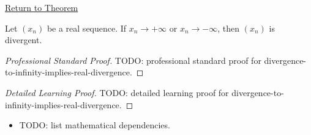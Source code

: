 \newpage
{}
\label{prf:divergence-to-infinity-implies-real-divergence}

\begin{remark*}[Return]
\hyperref[thm:divergence-to-infinity-implies-real-divergence]{Return to Theorem}
\end{remark*}

\begin{theorem*}
Let $(x_n)$ be a real sequence. If $x_n\to+\infty$ or $x_n\to-\infty$,
then $(x_n)$ is divergent.

\smallskip
\noindent
\end{theorem*}

\begin{proof}[Professional Standard Proof]
\LRAProofBodyStart
TODO: professional standard proof for divergence-to-infinity-implies-real-divergence.
\end{proof}

\begin{proof}[Detailed Learning Proof]
\LRAProofBodyStart
TODO: detailed learning proof for divergence-to-infinity-implies-real-divergence.
\end{proof}

\begin{remark*}
\end{remark*}

\begin{dependencies}
\begin{itemize}
  \item TODO: list mathematical dependencies.
\end{itemize}
\end{dependencies}

\clearpage
